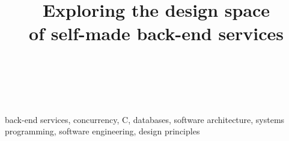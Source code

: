 \documentclass[journal]{IEEEtran}
\begin{document}
\title{Exploring the design space \\of self-made back-end services}

\author{\\
\\
}

\maketitle


\begin{IEEEkeywords}
back-end services, concurrency, C, databases, software architecture, systems programming, software engineering, design principles
\end{IEEEkeywords}





%



\nocite{*}

\end{document}
